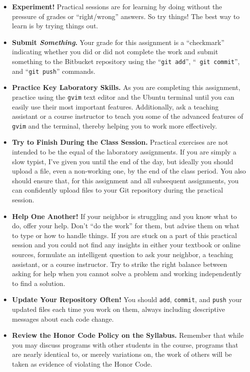 \begin{itemize}

\item {\bf Experiment!} Practical sessions are for learning by doing without the pressure of grades or ``right/wrong''
  answers. So try things!  The best way to learn is by trying things out.

\item {\bf Submit \textbf{\textit{Something}}.} Your grade for this assignment is a ``checkmark'' indicating whether you
  did or did not complete the work and submit something to the Bitbucket repository using the ``{\tt git add}'', ``{\tt
    git commit}'', and ``{\tt git push}'' commands.

\item {\bf Practice Key Laboratory Skills.} As you are completing this assignment, practice using the {\tt gvim} text
  editor and the Ubuntu terminal until you can easily use their most important features.  Additionally, ask
  a teaching assistant or a course instructor to teach you some of the advanced features of {\tt gvim} and the
  terminal, thereby helping you to work more effectively. 

\item {\bf Try to Finish During the Class Session.} Practical exercises are not intended to be the equal of the
  laboratory assignments. If you are simply a slow typist, I've given you until the end of the day, but ideally you
  should upload a file, even a non-working one, by the end of the class period. You also should ensure that, for this
  assignment and all subsequent assignments, you can confidently upload files to your Git repository during the
  practical session.

\item {\bf Help One Another!} If your neighbor is struggling and you know what to do, offer your help. Don't ``do the
  work'' for them, but advise them on what to type or how to handle things. If you are stuck on a part of this practical
  session and you could not find any insights in either your textbook or online sources, formulate an intelligent
  question to ask your neighbor, a teaching assistant, or a course instructor. Try to strike the right balance between
  asking for help when you cannot solve a problem and working independently to find a solution.

\item {\bf Update Your Repository Often!} You should {\tt add}, {\tt commit}, and {\tt push} your updated files each
  time you work on them, always including descriptive messages about each code change.

\item {\bf Review the Honor Code Policy on the Syllabus.} Remember that while you may discuss programs with other
  students in the course, programs that are nearly identical to, or merely variations on, the work of others will be
  taken as evidence of violating the Honor Code.

\end{itemize}


